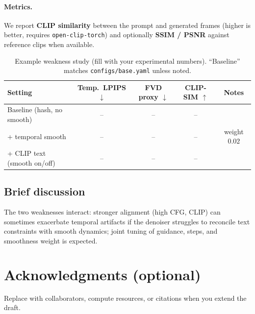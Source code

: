\documentclass[11pt,a4paper]{article}
\begin{document}
\paragraph{Metrics.}
We report \textbf{CLIP similarity} between the prompt and generated frames (higher is better, requires \texttt{open-clip-torch}) and optionally \textbf{SSIM / PSNR} against reference clips when available.

\begin{table}[htbp]
  \centering
  \caption{Example weakness study (fill with your experimental numbers). ``Baseline'' matches \texttt{configs/base.yaml} unless noted.}
  \label{tab:weak}
  \begin{tabular}{@{}lcccc@{}}
    \toprule
    Setting & Temp.\ LPIPS $\downarrow$ & FVD proxy $\downarrow$ & CLIP-SIM $\uparrow$ & Notes \\
    \midrule
    Baseline (hash, no smooth) & -- & -- & -- & \\
    + temporal smooth & -- & -- & -- & weight $0.02$ \\
    + CLIP text (smooth on/off) & -- & -- & -- & \\
    \bottomrule
  \end{tabular}
\end{table}

\subsection{Brief discussion}
The two weaknesses interact: stronger alignment (high CFG, CLIP) can sometimes exacerbate temporal artifacts if the denoiser struggles to reconcile text constraints with smooth dynamics; joint tuning of guidance, steps, and smoothness weight is expected.

\section*{Acknowledgments (optional)}
Replace with collaborators, compute resources, or citations when you extend the draft.
\end{document}
